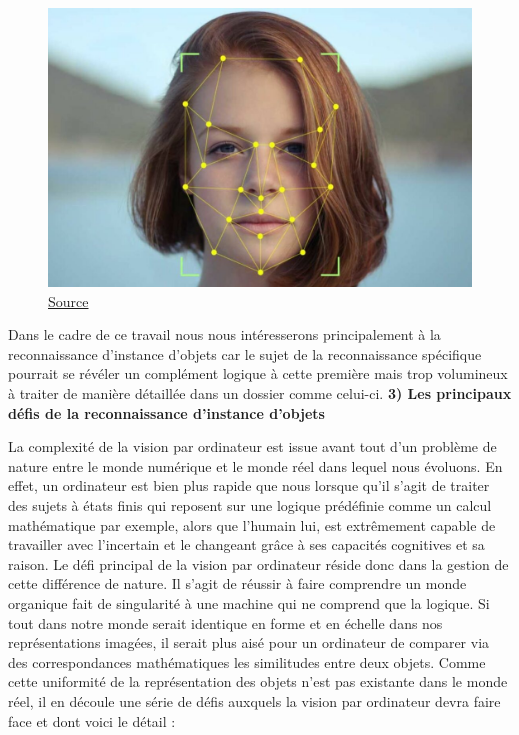 \documentclass[a4paper,12pt]{article} %
\begin{document}
\begin{figure}[h] %
  \centering %
  \includegraphics[scale=0.45]{face.jpg} %
  \caption{\href{https://www.eu-startups.com/2020/12/facial-recognition-tech-risks-regulations-and-future-startup-opportunities-in-the-eu/}{Source} }
\end{figure}
\newline
\par
Dans le cadre de ce travail nous nous intéresserons principalement à la reconnaissance d’instance d’objets car le sujet de la reconnaissance spécifique pourrait se révéler un complément logique à cette première mais trop volumineux à traiter de manière détaillée dans un dossier comme celui-ci.
\newpage
\textbf{3) Les principaux défis de la reconnaissance d’instance d’objets}
\newline
\par
	La complexité de la vision par ordinateur est issue avant tout d’un problème de nature entre le monde numérique et le monde réel dans lequel nous évoluons. En effet, un ordinateur est bien plus rapide que nous lorsque qu’il s’agit de traiter des sujets à états finis qui reposent sur une logique prédéfinie comme un calcul mathématique par exemple, alors que l’humain lui, est extrêmement capable de travailler avec l’incertain et le changeant grâce à ses capacités cognitives et sa raison. Le défi principal de la vision par ordinateur réside donc dans la gestion de cette différence de nature. Il s’agit de réussir à faire comprendre un monde organique fait de singularité à une machine qui ne comprend que la logique. Si tout dans notre monde serait identique en forme et en échelle dans nos représentations imagées, il serait plus aisé pour un ordinateur de comparer via des correspondances mathématiques les similitudes entre deux objets. Comme cette uniformité de la représentation des objets n’est pas existante dans le monde réel, il en découle une série de défis auxquels la vision par ordinateur devra faire face et dont voici le détail :\newline
\par
\end{document}
